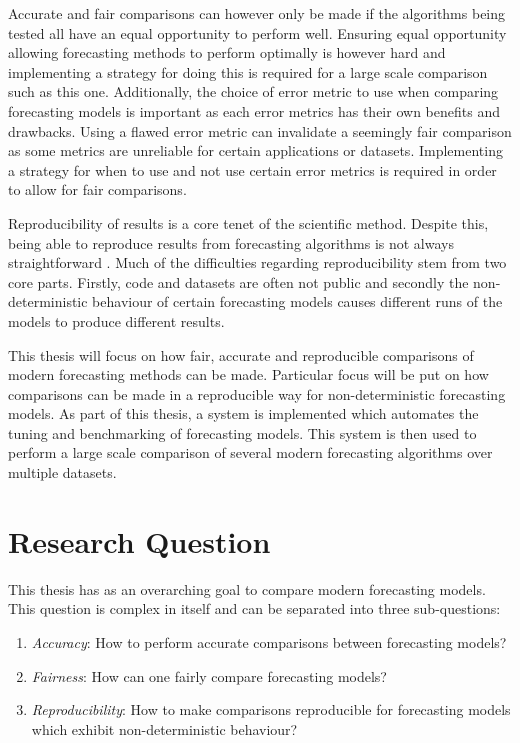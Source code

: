 Accurate and fair comparisons can however only be made if the algorithms being tested all have an equal opportunity to perform well. Ensuring equal opportunity allowing forecasting methods to perform optimally is however hard and implementing a strategy for doing this is required for a large scale comparison such as this one. Additionally, the choice of error metric to use when comparing forecasting models is important as each error metrics has their own benefits and drawbacks. Using a flawed error metric can invalidate a seemingly fair comparison as some metrics are unreliable for certain applications or datasets. Implementing a strategy for when to use and not use certain error metrics is required in order to allow for fair comparisons.

Reproducibility of results is a core tenet of the scientific method. Despite this, being able to reproduce results from forecasting algorithms is not always straightforward \cite{makridakis_m4_2020}. Much of the difficulties regarding reproducibility stem from two core parts. Firstly, code and datasets are often not public and secondly the non-deterministic behaviour of certain forecasting models causes different runs of the models to produce different results. 

This thesis will focus on how fair, accurate and reproducible comparisons of modern forecasting methods can be made. Particular focus will be put on how comparisons can be made in a reproducible way for non-deterministic forecasting models. As part of this thesis, a system is implemented which automates the tuning and benchmarking of forecasting models. This system is then used to perform a large scale comparison of several modern forecasting algorithms over multiple datasets.

\section{Research Question}
This thesis has as an overarching goal to compare modern forecasting models. This question is complex in itself and can be separated into three sub-questions:

\begin{enumerate}
\item \textit{Accuracy}: How to perform accurate comparisons between forecasting models?
\item \textit{Fairness}: How can one fairly compare forecasting models?
\item \textit{Reproducibility}: How to make comparisons reproducible for forecasting models which exhibit non-deterministic behaviour? 
\end{enumerate}

